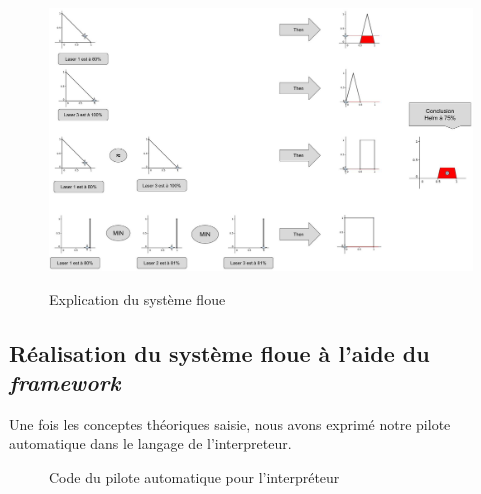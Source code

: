\documentclass[a4paper,11pt]{article}
\begin{document}
    \begin{figure}[H]
        \begin{center}
            \caption{Explication du système floue}
            \includegraphics[scale=0.4, angle=90]{assets/Fuzzy_System_Titanic_Helm.jpg}
            \label{fig:systemFuzzy}
        \end{center}
    \end{figure}

    \subsection{Réalisation du système floue à l'aide du \textit{framework}}

    Une fois les conceptes théoriques saisie, nous avons exprimé notre pilote automatique dans le langage de l'interpreteur.

    \begin{figure}[H]
        \begin{center}
            \caption{Code du pilote automatique pour l’interpréteur}
            
            \label{fig:codeAutoPilot}
        \end{center}
    \end{figure}
\end{document}
